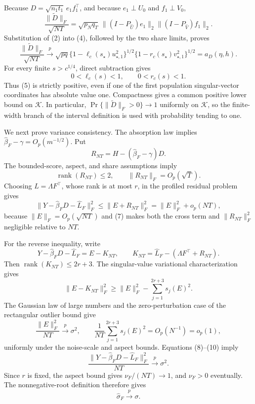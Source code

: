 Because \(D=\sqrt{n_1t_1}\,e_1f_1^{\top}\), and because \(e_1\perp U_0\) and \(f_1\perp V_0\),
\[
 \frac{\|\widetilde D\|_F}{\sqrt{NT}}
 =\sqrt{p_Nq_T}\,
 \|(I-P_{\widehat U})e_1\|_2
 \|(I-P_{\widehat V})f_1\|_2. \tag{4}
\]
Substitution of (2) into (4), followed by the two share limits, proves
\[
 \frac{\|\widetilde D\|_F}{\sqrt{NT}}
 \xrightarrow{p}
 \sqrt{pq}\{1-\ell_c(s_\star)u_{\star,1}^2\}^{1/2}
 \{1-r_c(s_\star)v_{\star,1}^2\}^{1/2}
 =a_D(\eta,h). \tag{5}
\]
For every finite \(s>c^{1/4}\), direct subtraction gives
\[
 0<\ell_c(s)<1,
 \qquad 0<r_c(s)<1. \tag{6}
\]
Thus (5) is strictly positive, even if one of the first population singular-vector coordinates has absolute value one.  Compactness gives a common positive lower bound on \(\mathcal K\).
In particular, \(\Pr\{\|\widetilde D\|_F>0\}\to1\) uniformly on \(\mathcal K\), so the finite-width branch of the interval definition is used with probability tending to one.

We next prove variance consistency.  The absorption law implies
\(\widehat\beta_F-\gamma=O_p(m^{-1/2})\).  Put
\[
 R_{NT}=H-(\widehat\beta_F-\gamma)D.
\]
The bounded-score, aspect, and share assumptions imply
\[
 \operatorname{rank}(R_{NT})\leq2,
 \qquad \|R_{NT}\|_F=O_p(\sqrt T). \tag{7}
\]
Choosing \(L=\Lambda F^{\top}\), whose rank is at most \(r\), in the profiled residual problem gives
\[
 \|Y-\widehat\beta_FD-\widehat L_F\|_F^2
 \leq\|E+R_{NT}\|_F^2
 =\|E\|_F^2+o_p(NT), \tag{8}
\]
because \(\|E\|_F=O_p(\sqrt{NT})\) and (7) makes both the cross term and \(\|R_{NT}\|_F^2\) negligible relative to \(NT\).

For the reverse inequality, write
\[
 Y-\widehat\beta_FD-\widehat L_F=E-K_{NT},
 \qquad
 K_{NT}=\widehat L_F-(\Lambda F^{\top}+R_{NT}).
\]
Then \(\operatorname{rank}(K_{NT})\leq2r+3\).  The singular-value variational characterization gives
\[
 \|E-K_{NT}\|_F^2
 \geq\|E\|_F^2-\sum_{j=1}^{2r+3}s_j(E)^2. \tag{9}
\]
The Gaussian law of large numbers and the zero-perturbation case of the rectangular outlier bound give
\[
 \frac{\|E\|_F^2}{NT}\xrightarrow{p}\sigma^2,
 \qquad
 \frac1{NT}\sum_{j=1}^{2r+3}s_j(E)^2
 =O_p(N^{-1})=o_p(1), \tag{10}
\]
uniformly under the noise-scale and aspect bounds.  Equations (8)--(10) imply
\[
 \frac{\|Y-\widehat\beta_FD-\widehat L_F\|_F^2}{NT}
 \xrightarrow{p}\sigma^2. \tag{11}
\]
Since \(r\) is fixed, the aspect bound gives \(\nu_F/(NT)\to1\), and \(\nu_F>0\) eventually.  The nonnegative-root definition therefore gives
\[
 \widehat\sigma_F\xrightarrow{p}\sigma. \tag{12}
\]

